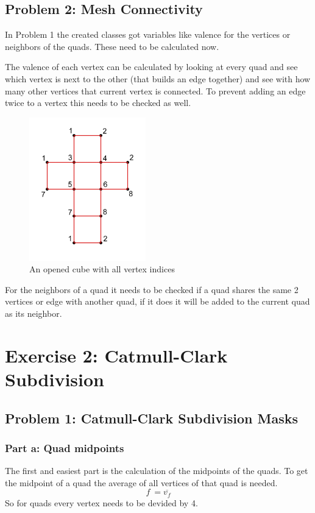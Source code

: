 \documentclass[11.5pt,oneside,a4paper]{scrartcl}
\newcounter{ct}
\begin{document}
\subsection{Problem 2: Mesh Connectivity}

In Problem 1 the created classes got variables like valence for the vertices or neighbors of the quads. These need to be calculated now.

The valence of each vertex can be calculated by looking at every quad and see which vertex is next to the other (that builds an edge together) and see with how many other vertices that current vertex is connected. To prevent adding an edge twice to a vertex this needs to be checked as well.


\begin{figure}
	\label{fig:cube}
	\includegraphics[width=0.45\textwidth]{cube.png}
	\caption{An opened cube with all vertex indices}
\end{figure}

For the neighbors of a quad it needs to be checked if a quad shares the same 2 vertices or edge with another quad, if it does it will be added to the current quad as its neighbor.

\section{Exercise 2: Catmull-Clark Subdivision}

\subsection{Problem 1: Catmull-Clark Subdivision Masks}

\subsubsection{Part a: Quad midpoints}
The first and easiest part is the calculation of the midpoints of the quads. To get the midpoint of a quad the average of all vertices of that quad is needed.
\begin{equation} \label{quadratic}
        f \ = \overline{v_{f}}
\end{equation} 
So for quads every vertex needs to be devided by 4.
\end{document}
